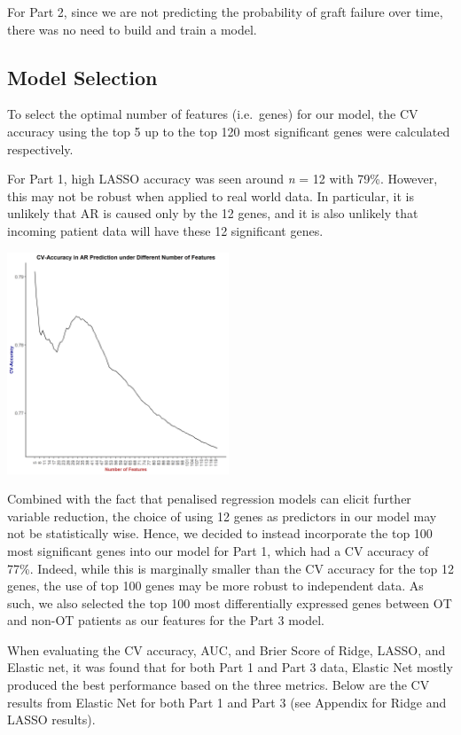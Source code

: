 \documentclass[a4paper,9pt,twocolumn,twoside,]{pinp}
\begin{document}
For Part 2, since we are not predicting the probability of graft failure
over time, there was no need to build and train a model.

\hypertarget{model-selection}{%
\subsection{Model Selection}\label{model-selection}}

To select the optimal number of features (i.e.~genes) for our model, the
CV accuracy using the top 5 up to the top 120 most significant genes
were calculated respectively.

For Part 1, high LASSO accuracy was seen around \emph{n} = 12 with 79\%.
However, this may not be robust when applied to real world data. In
particular, it is unlikely that AR is caused only by the 12 genes, and
it is also unlikely that incoming patient data will have these 12
significant genes.

\begin{center}\includegraphics[width=250px]{images/part1features} \end{center}

Combined with the fact that penalised regression models can elicit
further variable reduction, the choice of using 12 genes as predictors
in our model may not be statistically wise. Hence, we decided to instead
incorporate the top 100 most significant genes into our model for Part
1, which had a CV accuracy of 77\%. Indeed, while this is marginally
smaller than the CV accuracy for the top 12 genes, the use of top 100
genes may be more robust to independent data. As such, we also selected
the top 100 most differentially expressed genes between OT and non-OT
patients as our features for the Part 3 model.

When evaluating the CV accuracy, AUC, and Brier Score of Ridge, LASSO,
and Elastic net, it was found that for both Part 1 and Part 3 data,
Elastic Net mostly produced the best performance based on the three
metrics. Below are the CV results from Elastic Net for both Part 1 and
Part 3 (see Appendix for Ridge and LASSO results).
\end{document}
